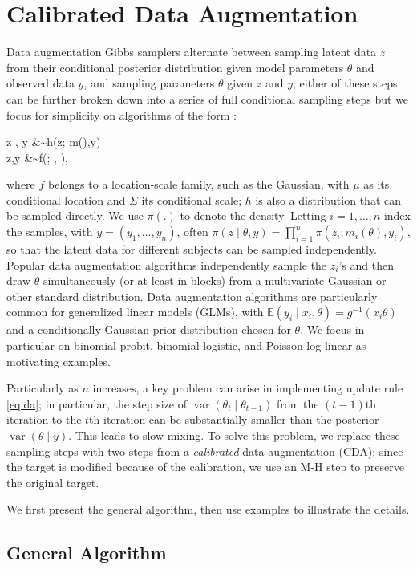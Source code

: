 \documentclass[10pt]{article}
\newcommand{\be}{\begin{equs}}
\newcommand{\ee}{\end{equs}}
\newcommand{\bb}[1]{\mathbb{#1}}
\DeclareMathOperator{\var}{var}
\begin{document}
\section{Calibrated Data Augmentation}
Data augmentation Gibbs samplers alternate between sampling  latent data $z$ from their conditional posterior distribution given model parameters $\theta$ and observed data $y$, and sampling parameters $\theta$ given $z$ and $y$; either of these steps can be further broken down into a series of full conditional sampling steps but we focus for simplicity on algorithms of the form \citep{tanner1987calculation}: 
\be \label{eq:da}
z \mid \theta, y &\sim h(z; m(\theta),y) \\
\theta \mid z,y &\sim f(\theta; \mu, \Sigma),
\ee
where $f$ belongs to a location-scale family, such as the Gaussian, with $\mu$ as its conditional location and $\Sigma$ its conditional scale; $h$ is also a distribution that can be sampled directly. We use $\pi(.)$ to denote the density.
Letting $i=1,\ldots,n$ index the samples, with $y=(y_1,\ldots,y_n)$, often $\pi(z \mid \theta,y) = 
\prod_{i=1}^n \pi(z_i; m_i(\theta), y_i)$, so that the latent data for different subjects can be sampled independently.  Popular data augmentation algorithms independently sample the $z_i$'s and then draw $\theta$ simultaneously (or at least in blocks) from a multivariate Gaussian or other standard distribution.  Data augmentation algorithms are particularly common for generalized linear models (GLMs), with $\bb E(y_i \mid x_i, \theta) = g^{-1}(x_i \theta)$ and a conditionally Gaussian prior distribution chosen for $\theta$. We focus in particular on binomial probit, binomial logistic, and Poisson log-linear as motivating examples.

Particularly as $n$ increases, a key problem can arise in implementing update rule \eqref{eq:da}; in particular, the step size of $\var(\theta_t \mid \theta_{t-1})$ from the $(t-1)$th iteration to the $t$th iteration can be substantially smaller than the posterior $\var(\theta \mid y)$.  This leads to slow mixing.  To solve this problem, we replace these sampling steps with two steps from a {\it calibrated} data augmentation (CDA); since the target is modified because of the calibration, we use an M-H step to preserve the original target. 

We first present the general algorithm, then use examples to illustrate the details.

 \subsection{General Algorithm}
 
\end{document}
